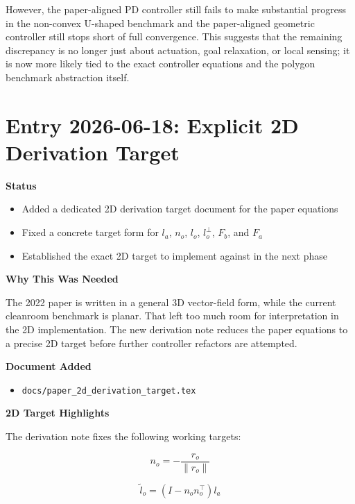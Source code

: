 \documentclass[11pt]{article}
\begin{document}
However, the paper-aligned PD controller still fails to make substantial
progress in the non-convex U-shaped benchmark and the paper-aligned geometric
controller still stops short of full convergence. This suggests that the
remaining discrepancy is no longer just about actuation, goal relaxation, or
local sensing; it is now more likely tied to the exact controller equations and
the polygon benchmark abstraction itself.

\section*{Entry 2026-06-18: Explicit 2D Derivation Target}

\textbf{Status}

\begin{itemize}[leftmargin=*]
  \item Added a dedicated 2D derivation target document for the paper equations
  \item Fixed a concrete target form for \(l_a\), \(n_o\), \(l_o\), \(l_o^\perp\), \(F_b\), and \(F_a\)
  \item Established the exact 2D target to implement against in the next phase
\end{itemize}

\textbf{Why This Was Needed}

The 2022 paper is written in a general 3D vector-field form, while the current
cleanroom benchmark is planar. That left too much room for interpretation in
the 2D implementation. The new derivation note reduces the paper equations to a
precise 2D target before further controller refactors are attempted.

\textbf{Document Added}

\begin{itemize}[leftmargin=*]
  \item \texttt{docs/paper\_2d\_derivation\_target.tex}
\end{itemize}

\textbf{2D Target Highlights}

The derivation note fixes the following working targets:

\begin{equation}
n_o = -\frac{r_o}{\lVert r_o \rVert}
\end{equation}

\begin{equation}
\tilde{l}_o = (I - n_on_o^\top) l_a
\end{equation}
\end{document}
